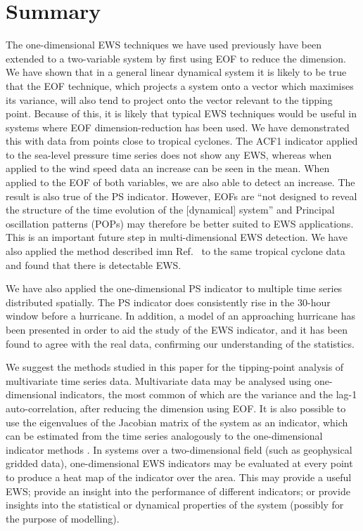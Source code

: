\documentclass[%
aip,
amsmath,amssymb,
reprint,%
]{revtex4-1}
\newcommand{\noteRed}[1]{{#1}}
\begin{document}
\section{Summary}
\label{sec:Summary}
The one-dimensional EWS techniques we have used previously \cite{prettyman2018} have been extended to a two-variable system by first using EOF to reduce the dimension. We have shown that in a general {\noteRed linear} dynamical system it is likely to be true that the EOF technique, which projects a system onto a vector which maximises its variance, will also tend to project onto the vector relevant to the tipping point. Because of this, it is likely that typical EWS techniques would be useful in systems where EOF dimension-reduction has been used.
We have demonstrated this with data from points close to tropical cyclones. The ACF1 indicator applied to the sea-level pressure time series does not show any EWS, whereas when applied to the wind speed data an increase can be seen in the mean. When applied to the EOF of both variables, we are also able to detect an increase. The result is also true of the PS indicator. However, EOFs are ``not designed to reveal the structure of the time evolution of the [dynamical] system'' \cite{hasselmann1988} and Principal oscillation patterns (POPs) \cite{von1995} may therefore be better suited to EWS applications. This is an important future step in multi-dimensional EWS detection. We have also applied the method described imn Ref.~ to the same tropical cyclone data and found that there is detectable EWS.

We have also applied the one-dimensional PS indicator to multiple time series distributed spatially. The PS indicator does consistently rise in the 30-hour window before a hurricane. In addition, a model of an approaching hurricane has been presented in order to aid the study of the EWS indicator, and it has been found to agree with the real data, confirming our understanding of the statistics.

We suggest the methods studied in this paper for the tipping-point analysis of multivariate time series data. Multivariate data may be analysed using one-dimensional indicators, the most common of which are the variance and the lag-1 auto-correlation, after reducing the dimension using EOF. It is also possible to use the eigenvalues of the Jacobian matrix of the system as an indicator, which can be estimated from the time series analogously to the one-dimensional indicator methods \cite{williamson2015}. In systems over a two-dimensional field (such as geophysical gridded data), one-dimensional EWS indicators may be evaluated at every point to produce a heat map of the indicator over the area. This may provide a useful EWS; provide an insight into the performance of different indicators; or provide insights into the statistical or dynamical properties of the system (possibly for the purpose of modelling). 
\end{document}
